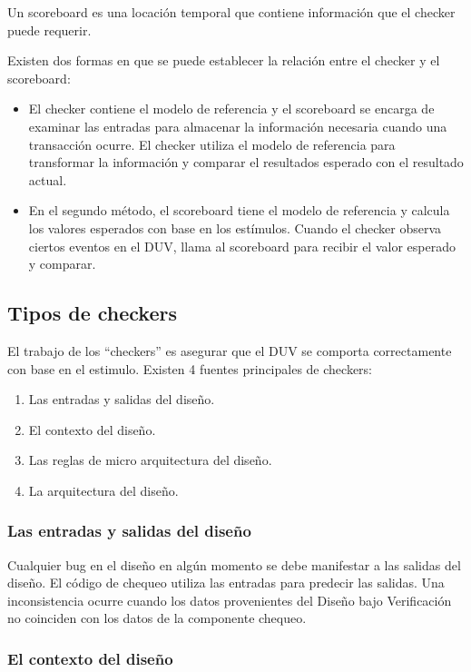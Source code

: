 Un scoreboard es una locación temporal que contiene información que el checker puede requerir.

Existen dos formas en que se puede establecer la relación entre el checker y el scoreboard:
\begin{itemize}
\item El checker contiene el modelo de referencia y el scoreboard se encarga de examinar las entradas para
almacenar la información necesaria cuando una transacción ocurre. El checker utiliza el modelo de referencia para transformar la información y comparar el resultados esperado con el resultado actual.
\item En el segundo método, el scoreboard tiene el modelo de referencia y calcula los valores esperados con base en los estímulos. Cuando el checker observa ciertos eventos en el DUV, llama al scoreboard para recibir el valor esperado y comparar.
\end{itemize}

\subsection{Tipos de checkers}

El trabajo de los “checkers” es asegurar que el DUV se comporta correctamente con base en el estimulo. Existen 4 fuentes principales de checkers:
\begin{enumerate}
\item Las entradas y salidas del diseño.
\item El contexto del diseño.
\item Las reglas de micro arquitectura del diseño.
\item La arquitectura del diseño.
\end{enumerate}


\subsubsection{Las entradas y salidas del diseño} 

Cualquier bug en el diseño en algún momento se debe manifestar a las salidas del diseño. El código de chequeo utiliza las entradas para predecir las salidas. Una inconsistencia ocurre cuando los datos provenientes del  Diseño bajo Verificación no coinciden con los datos de la componente chequeo. 

\subsubsection{El contexto del diseño} 


